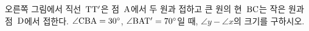 \noindent\begin{minipage}[t]{0.58\linewidth}\vspace{0pt}\raggedright 오른쪽 그림에서 직선~$\mathrm{TT'}$은 점~$\mathrm{A}$에서 두 원과 접하고 큰 원의 현~$\mathrm{BC}$는 작은 원과 점~$\mathrm{D}$에서 접한다. $\angle\mathrm{CBA}=30^\circ$, $\angle\mathrm{BAT'}=70^\circ$일 때, $\angle y-\angle x$의 크기를 구하시오.\end{minipage}\hfill\begin{minipage}[t]{0.4\linewidth}\vspace{0pt}\centering \resizebox{\ifdim\width>\linewidth\linewidth\else\width\fi}{!}{}\end{minipage}\par
